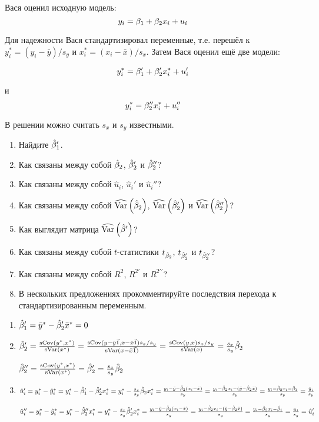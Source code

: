 \begin{problem}
Вася оценил исходную модель:
\[
y_i=\beta_1+\beta_2 x_i + u_i
\]

Для надежности Вася стандартизировал переменные, т.е. перешёл к $y_i^*=(y_i-\bar{y})/s_y$ и $x_i^*=(x_i-\bar{x})/s_x$. Затем Вася оценил ещё две модели:

\[
y_i^*=\beta_1'+\beta_2' x^*_i + u_i'
\]

и
\[
y_i^*=\beta_2'' x^*_i + u_i''
\]

В решении можно считать $s_x$ и $s_y$ известными.

\begin{enumerate}
\item Найдите $\hat{\beta}_1'$.
\item Как связаны между собой $\hat{\beta}_2$, $\hat{\beta}_2'$ и $\hat{\beta}_2''$?
\item Как связаны между собой $\hat{u}_i$, $\hat{u}_i'$ и $\hat{u}_i''$?
\item Как связаны между собой $\widehat{\operatorname{Var}}\left(\hat{\beta}_2\right)$, $\widehat{\operatorname{Var}}\left(\hat{\beta}_2'\right)$ и $\widehat{\operatorname{Var}}\left(\hat{\beta}_2''\right)$?
\item Как выглядит матрица $\widehat{\operatorname{Var}}\left(\hat{\beta}'\right)$?
\item Как связаны между собой $t$-статистики $t_{\hat{\beta}_2}$, $t_{\hat{\beta}_2'}$ и $t_{\hat{\beta}_2''}$?
\item Как связаны между собой $R^2$, $R^{2\prime}$ и $R^{2\prime\prime}$?
\item В нескольких предложениях прокомментируйте последствия перехода к стандартизированным переменным.
\end{enumerate}

\begin{sol}
\begin{enumerate}
\item $\hat\beta_1'=\bar y^* -\hat{\beta}_2'\bar x^*=0$

\item $\hb_2'=\frac{\sCov(y^*,x^*)}{\sVar(x^*)}=\frac{\sCov(y-\bar y\v1,x-\bar x\v1)s_x/s_y}{\sVar(x-\bar x\v1)}=\frac{\sCov(y, x)s_x/s_y}{\sVar(x)}=\frac{s_x}{s_y}\hb_2$

$\hat{\beta}_2''=\frac{\operatorname{sCov}(y^*,x^*)}{\operatorname{sVar}(x^*)}=\hat{\beta}_2'=\frac{s_x}{s_y}\hat{\beta}_2$

\item $\hat u_i'=y_i^*-\hat{y}_i^*=y_i^*-\hat{\beta}_1'-\hat{\beta}_2'x_i^*=y_i^*-\frac{s_x}{s_y}\hat{\beta}_2x_i^*=\frac{y_i-\bar y-\hat{\beta}_2(x_i-\bar x)}{s_y}=\frac{y_i-\hat{\beta}_2x_i-(\bar y-\hat{\beta}_2\bar x)}{s_y}=\frac{y_i-\hat{\beta}_2x_i-\hat{\beta}_1}{s_y}=\frac{\hat u_i}{s_y}$

$\hat u_i''=y_i^*-\hat{y}_i^*=y_i^*-\hat{\beta}_2''x_i^*=y_i^*-\frac{s_x}{s_y}\hat{\beta}_2'x_i^*=\frac{y_i-\bar y-\hat{\beta}_2(x_i-\bar x)}{s_y}=\frac{y_i-\hat{\beta}_2x_i-(\bar y-\hat{\beta}_2\bar x)}{s_y}=\frac{y_i-\hat{\beta}_2x_i-\hat{\beta}_1}{s_y}=\frac{u_i}{s_y}=\hat u_i'$


\end{enumerate}
\end{sol}
\end{problem}
